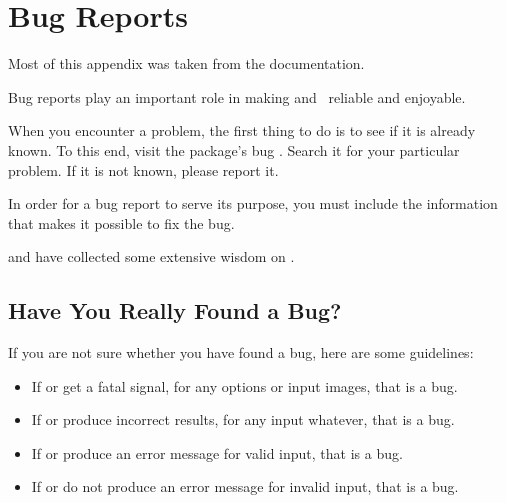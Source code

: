 

\chapter[Bug Reports\commonpart]{\label{sec:bug-reports}%
  Bug Reports\commonpart}

\begin{geeknote}
  \noindent Most of this appendix was taken from the  documentation.
\end{geeknote}

Bug reports play an important role in making \App{} and~\OtherApp{} reliable and enjoyable.

%
%
When you encounter a problem, the first thing to do is to see if it is already known.  To this
end, visit the package's  bug
.  Search it for your particular problem.  If it is not
known, please report it.

In order for a bug report to serve its purpose, you must include the information that makes it
possible to fix the bug.

 and  have collected some extensive wisdom
on .


\section[Found a Bug?]{\label{sec:have-you-really-found-a-bug}%
  Have You Really Found a Bug?}

If you are not sure whether you have found a bug, here are some guidelines:

\begin{itemize}
\item
  If \App{} or \OtherApp{} get a fatal signal, for any options or input images, that is a bug.

\item
  If \App{} or \OtherApp{} produce incorrect results, for any input whatever, that is a bug.

\item
  If \App{} or \OtherApp{} produce an error message for valid input, that is a bug.

\item
  If \App{} or \OtherApp{} do not produce an error message for invalid input, that is a bug.
\end{itemize}


